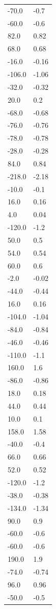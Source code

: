 \begin{longtable}{ll}
-70.0 & -0.7 \\
-60.0 & -0.6 \\
82.0 & 0.82 \\
68.0 & 0.68 \\
-16.0 & -0.16 \\
-106.0 & -1.06 \\
-32.0 & -0.32 \\
20.0 & 0.2 \\
-68.0 & -0.68 \\
-76.0 & -0.76 \\
-78.0 & -0.78 \\
-28.0 & -0.28 \\
84.0 & 0.84 \\
-218.0 & -2.18 \\
-10.0 & -0.1 \\
16.0 & 0.16 \\
4.0 & 0.04 \\
-120.0 & -1.2 \\
50.0 & 0.5 \\
54.0 & 0.54 \\
60.0 & 0.6 \\
-2.0 & -0.02 \\
-44.0 & -0.44 \\
16.0 & 0.16 \\
-104.0 & -1.04 \\
-84.0 & -0.84 \\
-46.0 & -0.46 \\
-110.0 & -1.1 \\
160.0 & 1.6 \\
-86.0 & -0.86 \\
18.0 & 0.18 \\
44.0 & 0.44 \\
10.0 & 0.1 \\
158.0 & 1.58 \\
-40.0 & -0.4 \\
66.0 & 0.66 \\
52.0 & 0.52 \\
-120.0 & -1.2 \\
-38.0 & -0.38 \\
-134.0 & -1.34 \\
90.0 & 0.9 \\
-60.0 & -0.6 \\
-60.0 & -0.6 \\
190.0 & 1.9 \\
-74.0 & -0.74 \\
96.0 & 0.96 \\
-50.0 & -0.5 \\

\end{longtable}
